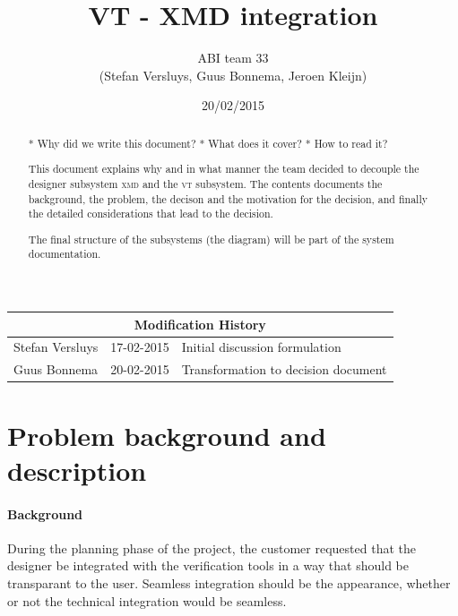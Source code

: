 \documentclass[a4paper,11pt,final]{article}
\author{ABI team 33\\(Stefan Versluys, Guus Bonnema, Jeroen Kleijn)}
\date{20/02/2015}
\title{\color{blue}VT - XMD integration}
\newcommand{\xmd}{\textsc{xmd}\xspace}%
\newcommand{\vt}{\textsc{vt}\xspace}%
\begin{document}

\maketitle

\begin{abstract}

	* Why did we write this document? 
	* What does it cover?
	* How to read it? 
	
	This document explains why and in what manner the team decided 
	to decouple the designer subsystem \xmd and the \vt subsystem.
	The contents documents the background, the problem, the decison
	and the motivation for the decision, and finally the detailed 
	considerations that lead to the decision.
	
	The final structure of the subsystems (the diagram) will be part of 
	the system documentation.
\end{abstract}


\begin{tabular}{|l|l|p{20em}|}
\hline 
\multicolumn{3}{|c|}{\bf Modification History}\\\hline
Stefan Versluys & 17-02-2015 & Initial discussion formulation \\\hline 
Guus Bonnema & 20-02-2015 & Transformation to decision document \\\hline 
\end{tabular} 

\maketitle

\tableofcontents

\section{Problem background and description}

\paragraph{Background}
During the planning phase of the project, the customer requested that
the designer be integrated with the verification tools in a way that
should be transparant to the user. Seamless integration should be the
appearance, whether or not the technical integration would be seamless.
\end{document}
